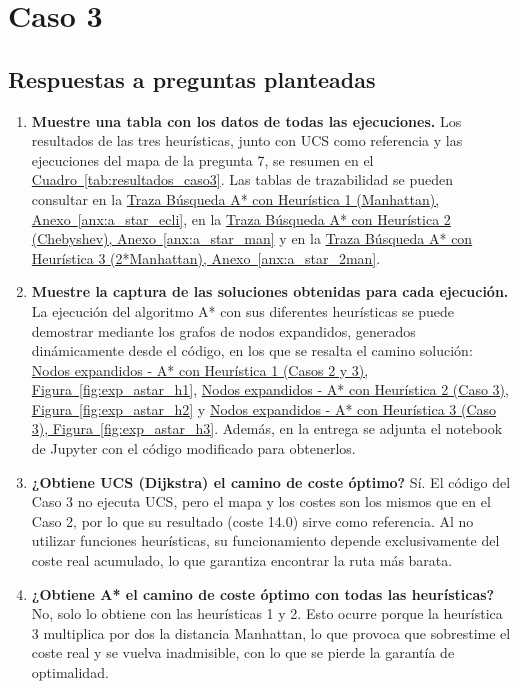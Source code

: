 \documentclass[12pt,a4paper]{article}
\begin{document}
\section{Caso 3}

\subsection{Respuestas a preguntas planteadas}
\begin{enumerate}

    \item \textbf{Muestre una tabla con los datos de todas las ejecuciones.} Los resultados de las tres heurísticas, junto con UCS como referencia y las ejecuciones del mapa de la pregunta 7, se resumen en el \hyperref[tab:resultados_caso3]{Cuadro~\ref*{tab:resultados_caso3}}. Las tablas de trazabilidad se pueden consultar en la \hyperref[anx:a_star_ecli]{Traza Búsqueda A* con Heurística 1 (Manhattan), Anexo~\ref*{anx:a_star_ecli}}, en la \hyperref[anx:a_star_man]{Traza Búsqueda A* con Heurística 2 (Chebyshev), Anexo~\ref*{anx:a_star_man}} y en la \hyperref[anx:a_star_2man]{Traza Búsqueda A* con Heurística 3 (2*Manhattan), Anexo~\ref*{anx:a_star_2man}}.
    \item \textbf{Muestre la captura de las soluciones obtenidas para cada ejecución.} La ejecución del algoritmo A* con sus diferentes heurísticas se puede demostrar mediante los grafos de nodos expandidos, generados dinámicamente desde el código, en los que se resalta el camino solución:
\hyperref[fig:exp_astar_h1]{Nodos expandidos - A* con Heurística 1 (Casos 2 y 3), Figura~\ref*{fig:exp_astar_h1}},
\hyperref[fig:exp_astar_h2]{Nodos expandidos - A* con Heurística 2 (Caso 3), Figura~\ref*{fig:exp_astar_h2}} y
\hyperref[fig:exp_astar_h3]{Nodos expandidos - A* con Heurística 3 (Caso 3), Figura~\ref*{fig:exp_astar_h3}}.
Además, en la entrega se adjunta el notebook de Jupyter con el código modificado para obtenerlos.
    \item \textbf{¿Obtiene UCS (Dijkstra) el camino de coste óptimo?} Sí. El código del Caso 3 no ejecuta UCS, pero el mapa y los costes son los mismos que en el Caso 2, por lo que su resultado (coste 14.0) sirve como referencia. Al no utilizar funciones heurísticas, su funcionamiento depende exclusivamente del coste real acumulado, lo que garantiza encontrar la ruta más barata. 
    \item \textbf{¿Obtiene A* el camino de coste óptimo con todas las heurísticas?} No, solo lo obtiene con las heurísticas 1 y 2. Esto ocurre porque la heurística 3 multiplica por dos la distancia Manhattan, lo que provoca que sobrestime el coste real y se vuelva inadmisible, con lo que se pierde la garantía de optimalidad.

\end{enumerate}
\end{document}

